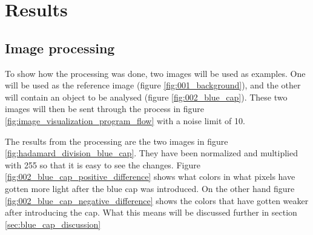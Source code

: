 \section{Results}

\subsection{Image processing}
\label{sec:image_processing}

To show how the processing was done, two images will be used as examples. One will be used as the reference image (figure \ref{fig:001_background}), and the other will contain an object to be analysed (figure \ref{fig:002_blue_cap}). These two images will then be sent through the process in figure \ref{fig:image_visualization_program_flow} with a noise limit of 10. 

The results from the processing are the two images in figure \ref{fig:hadamard_division_blue_cap}. They have been normalized and multiplied with 255 so that it is easy to see the changes. %
Figure \ref{fig:002_blue_cap_positive_difference} shows what colors in what pixels have gotten more light after the blue cap was introduced. On the other hand figure \ref{fig:002_blue_cap_negative_difference} shows the colors that have gotten weaker after introducing the cap. What this means will be discussed further in section \ref{sec:blue_cap_discussion}

